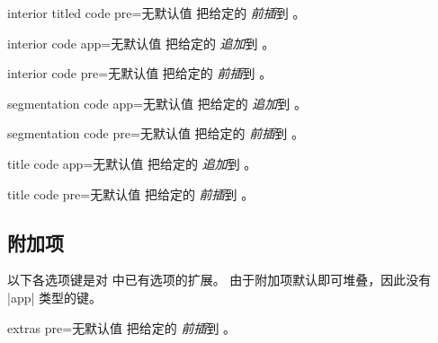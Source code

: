 \begin{docTcbKey}{interior titled code pre}{=}{无默认值}
  把给定的  \emph{前插}到 。
\end{docTcbKey}

\begin{docTcbKey}{interior code app}{=}{无默认值}
  把给定的  \emph{追加}到 。
\end{docTcbKey}

\begin{docTcbKey}{interior code pre}{=}{无默认值}
  把给定的  \emph{前插}到 。
\end{docTcbKey}

\begin{docTcbKey}{segmentation code app}{=}{无默认值}
  把给定的  \emph{追加}到 。
\end{docTcbKey}

\begin{docTcbKey}{segmentation code pre}{=}{无默认值}
  把给定的  \emph{前插}到 。
\end{docTcbKey}


\begin{docTcbKey}{title code app}{=}{无默认值}
  把给定的  \emph{追加}到 。
\end{docTcbKey}

\begin{docTcbKey}{title code pre}{=}{无默认值}
  把给定的  \emph{前插}到 。
\end{docTcbKey}


\clearpage
\subsection{附加项}
以下各选项键是对  中已有选项的扩展。
由于附加项默认即可堆叠，因此没有 |app| 类型的键。

\begin{docTcbKey}[][doc new=2015-07-16]{extras pre}{=}{无默认值}
  把给定的  \emph{前插}到 。
\end{docTcbKey}

